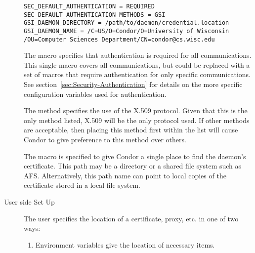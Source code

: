 \begin{description}
\footnotesize
\begin{verbatim}
SEC_DEFAULT_AUTHENTICATION = REQUIRED
SEC_DEFAULT_AUTHENTICATION_METHODS = GSI
GSI_DAEMON_DIRECTORY = /path/to/daemon/credential.location
GSI_DAEMON_NAME = /C=US/O=Condor/O=University of Wisconsin
/OU=Computer Sciences Department/CN=condor@cs.wisc.edu
\end{verbatim}
\normalsize

The
 macro specifies that
authentication is required for all communications.
This single macro covers all communications, but could be
replaced with a set of macros that require authentication for
only specific communications.
See section~\ref{sec:Security-Authentication} for details on the
more specific configuration variables used for authentication.

The  method specifies the use of
the X.509 protocol. 
Given that this is the only method listed, X.509 will be the only
protocol used.
If other methods are acceptable, then placing this method
first within the list will cause Condor to give preference to
this method over others.

The macro  is specified
to give
Condor a single place to find the daemon's certificate.
This path may be a directory or a shared file system such as AFS. 
Alternatively, this path name can point to 
local copies of the certificate stored
in a local file system.


\item[User side Set Up]

The user specifies the location of a certificate, proxy, etc.
in one of two ways:
\begin{enumerate}
\item
Environment variables give the location of necessary items.


\end{enumerate}
\end{description}
